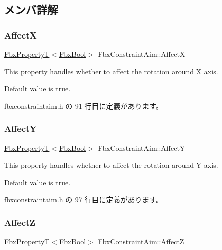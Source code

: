 \subsection{メンバ詳解}
\mbox{\label{class_fbx_constraint_aim_a93257a107d3b178be6af8a221cf1b819}} 
\subsubsection{\texorpdfstring{AffectX}{AffectX}}
{\footnotesize\ttfamily \hyperlink{class_fbx_property_t}{Fbx\+PropertyT}$<$\hyperlink{fbxtypes_8h_a92e0562b2fe33e76a242f498b362262e}{Fbx\+Bool}$>$ Fbx\+Constraint\+Aim\+::\+AffectX}

This property handles whether to affect the rotation around X axis.

Default value is true. 

 fbxconstraintaim.\+h の 91 行目に定義があります。

\mbox{\label{class_fbx_constraint_aim_af3de7ec97229a3b7e63d23a3d9daaa98}} 
\subsubsection{\texorpdfstring{AffectY}{AffectY}}
{\footnotesize\ttfamily \hyperlink{class_fbx_property_t}{Fbx\+PropertyT}$<$\hyperlink{fbxtypes_8h_a92e0562b2fe33e76a242f498b362262e}{Fbx\+Bool}$>$ Fbx\+Constraint\+Aim\+::\+AffectY}

This property handles whether to affect the rotation around Y axis.

Default value is true. 

 fbxconstraintaim.\+h の 97 行目に定義があります。

\mbox{\label{class_fbx_constraint_aim_ae376b28fe860f28e13a92c8ce727363c}} 
\subsubsection{\texorpdfstring{AffectZ}{AffectZ}}
{\footnotesize\ttfamily \hyperlink{class_fbx_property_t}{Fbx\+PropertyT}$<$\hyperlink{fbxtypes_8h_a92e0562b2fe33e76a242f498b362262e}{Fbx\+Bool}$>$ Fbx\+Constraint\+Aim\+::\+AffectZ}


